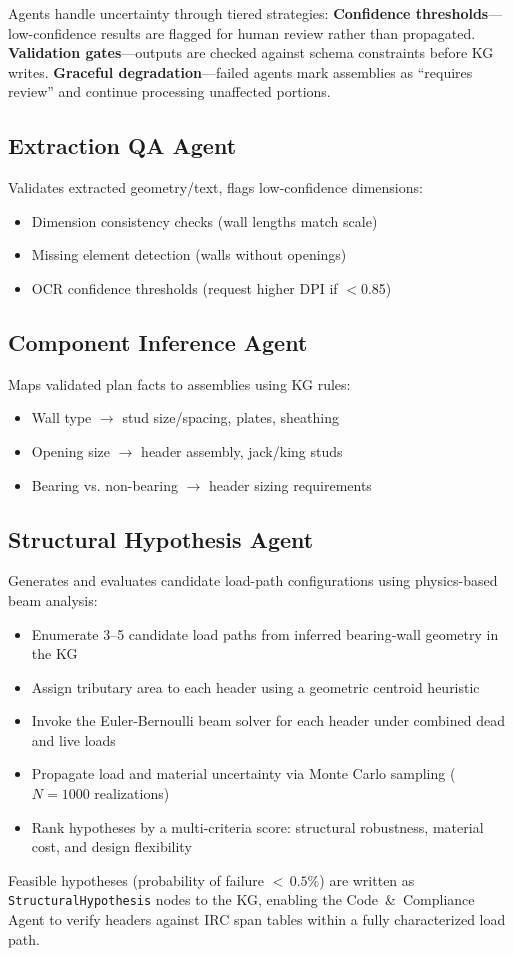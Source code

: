 Agents handle uncertainty through tiered strategies:
\textbf{Confidence thresholds}---low-confidence results are flagged for human review rather than propagated.
\textbf{Validation gates}---outputs are checked against schema constraints before KG writes.
\textbf{Graceful degradation}---failed agents mark assemblies as ``requires review'' and continue processing unaffected portions.

\subsection{Extraction QA Agent}

Validates extracted geometry/text, flags low-confidence dimensions:
\begin{itemize}
  \item Dimension consistency checks (wall lengths match scale)
  \item Missing element detection (walls without openings)
  \item OCR confidence thresholds (request higher DPI if $<$0.85)
\end{itemize}

\subsection{Component Inference Agent}

Maps validated plan facts to assemblies using KG rules:
\begin{itemize}
  \item Wall type $\rightarrow$ stud size/spacing, plates, sheathing
  \item Opening size $\rightarrow$ header assembly, jack/king studs
  \item Bearing vs. non-bearing $\rightarrow$ header sizing requirements
\end{itemize}

\subsection{Structural Hypothesis Agent}

Generates and evaluates candidate load-path configurations using physics-based beam analysis:
\begin{itemize}
  \item Enumerate 3--5 candidate load paths from inferred bearing-wall geometry in the KG
  \item Assign tributary area to each header using a geometric centroid heuristic
  \item Invoke the Euler-Bernoulli beam solver for each header under combined dead and live loads
  \item Propagate load and material uncertainty via Monte Carlo sampling ($N{=}1000$ realizations)
  \item Rank hypotheses by a multi-criteria score: structural robustness, material cost, and design flexibility
\end{itemize}
Feasible hypotheses (probability of failure ${<}\,0.5\%$) are written as \texttt{StructuralHypothesis} nodes to the KG, enabling the Code~\&~Compliance Agent to verify headers against IRC span tables within a fully characterized load path.

